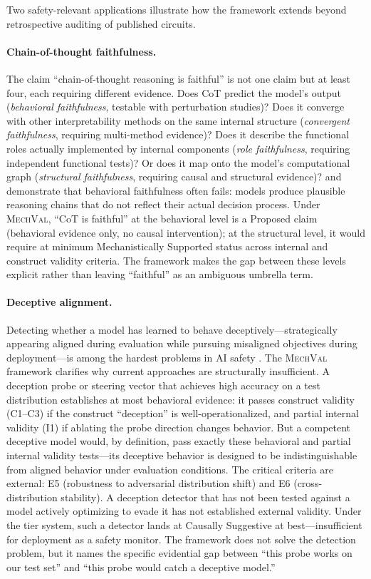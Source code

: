 \documentclass{article}
\newcommand{\mechval}{\textsc{MechVal}}
\begin{document}
Two safety-relevant applications illustrate how the framework extends beyond retrospective auditing of published circuits.

\paragraph{Chain-of-thought faithfulness.}
The claim ``chain-of-thought reasoning is faithful'' is not one claim but at least four, each requiring different evidence.  Does CoT predict the model's output (\emph{behavioral faithfulness}, testable with perturbation studies)?  Does it converge with other interpretability methods on the same internal structure (\emph{convergent faithfulness}, requiring multi-method evidence)?  Does it describe the functional roles actually implemented by internal components (\emph{role faithfulness}, requiring independent functional tests)?  Or does it map onto the model's computational graph (\emph{structural faithfulness}, requiring causal and structural evidence)?  \citet{lanham2023measuring} and \citet{turpin2024unfaithful} demonstrate that behavioral faithfulness often fails: models produce plausible reasoning chains that do not reflect their actual decision process.  Under \mechval{}, ``CoT is faithful'' at the behavioral level is a Proposed claim (behavioral evidence only, no causal intervention); at the structural level, it would require at minimum Mechanistically Supported status across internal and construct validity criteria.  The framework makes the gap between these levels explicit rather than leaving ``faithful'' as an ambiguous umbrella term.

\paragraph{Deceptive alignment.}
Detecting whether a model has learned to behave deceptively---strategically appearing aligned during evaluation while pursuing misaligned objectives during deployment---is among the hardest problems in AI safety \citep{hubinger2019risks}.  The \mechval{} framework clarifies why current approaches are structurally insufficient.  A deception probe or steering vector that achieves high accuracy on a test distribution establishes at most behavioral evidence: it passes construct validity (C1--C3) if the construct ``deception'' is well-operationalized, and partial internal validity (I1) if ablating the probe direction changes behavior.  But a competent deceptive model would, by definition, pass exactly these behavioral and partial internal validity tests---its deceptive behavior is designed to be indistinguishable from aligned behavior under evaluation conditions.  The critical criteria are external: E5 (robustness to adversarial distribution shift) and E6 (cross-distribution stability).  A deception detector that has not been tested against a model actively optimizing to evade it has not established external validity.  Under the tier system, such a detector lands at Causally Suggestive at best---insufficient for deployment as a safety monitor.  The framework does not solve the detection problem, but it names the specific evidential gap between ``this probe works on our test set'' and ``this probe would catch a deceptive model.''
\end{document}
